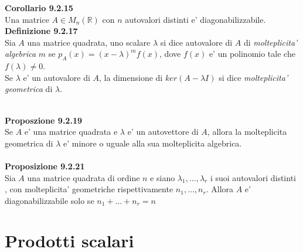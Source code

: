 \documentclass{article}
\begin{document}
\textbf{Corollario 9.2.15}
\\ Una matrice $A \in M_n(\mathbb{R})$ con $n$ autovalori distinti e' diagonabilizzabile.
\vspace{1em}
\\
\textbf{Definizione 9.2.17}
\\ Sia $A$ una matrice quadrata, uno scalare $\lambda$ si dice autovalore di $A$ di \textit{molteplicita' algebrica} $m$ se $p_A(x)=(x-\lambda)^mf(x)$, dove $f(x)$ e' un polinomio tale che $f(\lambda)\neq 0$. \\
Se $\lambda$ e' un autovalore di $A$, la dimensione di $ker(A-\lambda I)$ si dice \textit{molteplicita' geometrica} di $\lambda$. 

\textbf{\\Proposzione 9.2.19}
\\ Se $A$ e' una matrice quadrata e $\lambda$ e' un autovettore di $A$, allora la molteplicita geometrica di $\lambda$ e' minore o uguale alla sua molteplicita algebrica.\\

\textbf{\\Proposizione 9.2.21}
\\ Sia $A$ una matrice quadrata di ordine $n$ e siano $\lambda_1,\dots,\lambda_r$ i suoi autovalori distinti , con molteplicita' geometriche rispettivamente $n_1,\dots,n_r$. Allora $A$ e' diagonabilizzabile solo se $n_1+\dots+n_r=n$

\pagebreak
\section{Prodotti scalari}
\end{document}
